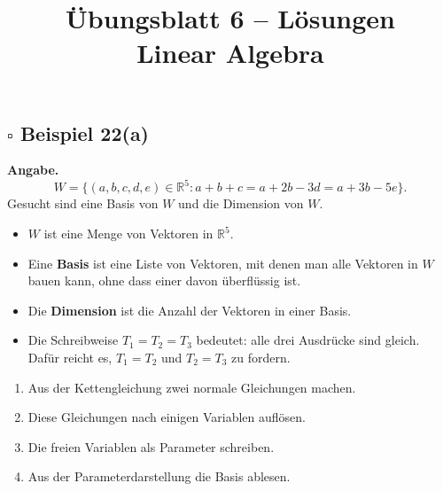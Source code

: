 \documentclass[a4paper,12pt]{article}
\title{\"Ubungsblatt 6 -- L\"osungen \\ \large Linear Algebra}
\author{}
\date{}
\begin{document}
\maketitle

\begin{center}
\end{center}

\subsection*{$\square$ Beispiel 22(a)}

\textbf{Angabe.}
\[
W = \{(a,b,c,d,e)\in \mathbb{R}^5 : a+b+c = a+2b-3d = a+3b-5e\}.
\]
Gesucht sind eine Basis von $W$ und die Dimension von $W$.

\begin{begriffe}
\begin{itemize}[leftmargin=*, nosep]
    \item $W$ ist eine Menge von Vektoren in $\mathbb{R}^5$.
    \item Eine \textbf{Basis} ist eine Liste von Vektoren, mit denen man alle Vektoren in $W$ bauen kann, ohne dass einer davon \"uberfl\"ussig ist.
    \item Die \textbf{Dimension} ist die Anzahl der Vektoren in einer Basis.
    \item Die Schreibweise $T_1=T_2=T_3$ bedeutet: alle drei Ausdr\"ucke sind gleich. Daf\"ur reicht es, $T_1=T_2$ und $T_2=T_3$ zu fordern.
\end{itemize}
\end{begriffe}

\begin{wastun}
\begin{enumerate}[leftmargin=*, nosep]
    \item Aus der Kettengleichung zwei normale Gleichungen machen.
    \item Diese Gleichungen nach einigen Variablen aufl\"osen.
    \item Die freien Variablen als Parameter schreiben.
    \item Aus der Parameterdarstellung die Basis ablesen.
\end{enumerate}
\end{wastun}
\end{document}
